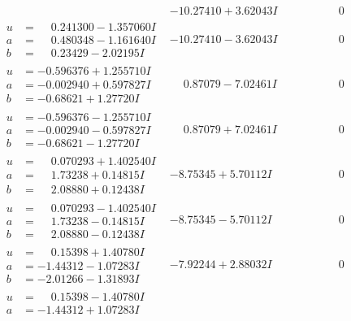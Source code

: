 \documentclass[1p]{elsarticle_modified}
\theoremstyle{definition}
\begin{document}
$$\begin{array}{c|c|c}
 & -10.27410 + 3.62043 I & \phantom{-0.000000 } 0 \\ \hline\begin{aligned}
u &= \phantom{-}0.241300 - 1.357060 I \\
a &= \phantom{-}0.480348 - 1.161640 I \\
b &= \phantom{-}0.23429 - 2.02195 I\end{aligned}
 & -10.27410 - 3.62043 I & \phantom{-0.000000 } 0 \\ \hline\begin{aligned}
u &= -0.596376 + 1.255710 I \\
a &= -0.002940 + 0.597827 I \\
b &= -0.68621 + 1.27720 I\end{aligned}
 & \phantom{-}0.87079 - 7.02461 I & \phantom{-0.000000 } 0 \\ \hline\begin{aligned}
u &= -0.596376 - 1.255710 I \\
a &= -0.002940 - 0.597827 I \\
b &= -0.68621 - 1.27720 I\end{aligned}
 & \phantom{-}0.87079 + 7.02461 I & \phantom{-0.000000 } 0 \\ \hline\begin{aligned}
u &= \phantom{-}0.070293 + 1.402540 I \\
a &= \phantom{-}1.73238 + 0.14815 I \\
b &= \phantom{-}2.08880 + 0.12438 I\end{aligned}
 & -8.75345 + 5.70112 I & \phantom{-0.000000 } 0 \\ \hline\begin{aligned}
u &= \phantom{-}0.070293 - 1.402540 I \\
a &= \phantom{-}1.73238 - 0.14815 I \\
b &= \phantom{-}2.08880 - 0.12438 I\end{aligned}
 & -8.75345 - 5.70112 I & \phantom{-0.000000 } 0 \\ \hline\begin{aligned}
u &= \phantom{-}0.15398 + 1.40780 I \\
a &= -1.44312 - 1.07283 I \\
b &= -2.01266 - 1.31893 I\end{aligned}
 & -7.92244 + 2.88032 I & \phantom{-0.000000 } 0 \\ \hline\begin{aligned}
u &= \phantom{-}0.15398 - 1.40780 I \\
a &= -1.44312 + 1.07283 I \\

\end{aligned}
\end{array}$$
\end{document}
